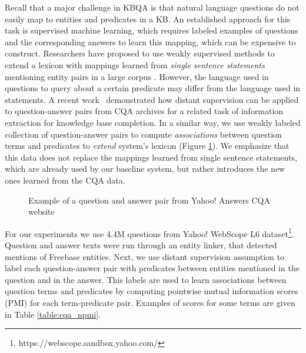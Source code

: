 Recall that a major challenge in KBQA is that natural language questions do not easily  map to entities and predicates in a KB.
An established approach for this task is supervised machine learning, which requires labeled examples of questions and the corresponding answers to learn this mapping, which can be expensive to construct.
Researchers have proposed to use weakly supervised methods to extend a lexicon with mappings learned from \textit{single sentence statements} mentioning entity pairs in a large corpus \cite{yao2014information}.
However, the language used in questions to query about a certain predicate may differ from the language used in statements.
A recent work~\cite{savenkov-EtAl:2015:SRW} demonstrated how distant supervision can be applied to question-answer pairs from CQA archives for a related task of information extraction for knowledge base completion.
In a similar way, we use weakly labeled collection of question-answer pairs to compute {\em associations} between question terms and predicates to \textit{extend} system's lexicon (Figure \ref{fig:cqa_example}).
We emphasize that this data does not replace the mappings learned from single sentence statements, which are already used by our baseline system, but rather introduces the new ones learned from the CQA data.

\begin{figure}
\centering
{}
\vspace{-2mm}
\caption{Example of a question and answer pair from Yahoo! Answers CQA website}
\label{fig:cqa_example}
\vspace{-2mm}
\end{figure}

For our experiments we use 4.4M questions from Yahoo! WebScope L6 dataset\footnote{https://webscope.sandbox.yahoo.com/}.
Question and answer texts were run through an entity linker, that detected mentions of Freebase entities.
Next, we use distant supervision assumption to label each question-answer pair with predicates between entities mentioned in the question and in the answer.
This labels are used to learn associations between question terms and predicates by computing pointwise mutual information scores (PMI) for each term-predicate pair.
Examples of scores for some terms are given in Table \ref{table:cqa_npmi}.

